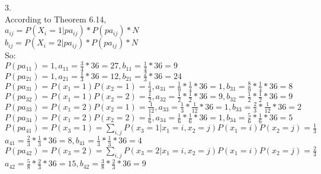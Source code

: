 \documentclass[a4paper]{article}
\begin{document}
3. \\
According to Theorem 6.14, \\
$a_{ij}=P(X_i=1|pa_{ij})*P(pa_{ij})*N$\\
$b_{ij}=P(X_i=2|pa_{ij})*P(pa_{ij})*N$\\
So:\\
$P(pa_{11}) = 1, a_{11}=\frac{3}{4}*36=27, b_{11}=\frac{1}{4}*36=9$\\
$P(pa_{21}) = 1, a_{21}=\frac{1}{3}*36=12, b_{21}=\frac{2}{3}*36=24$\\
$P(pa_{31}) = P(x_1=1)P(x_2=1)=\frac{1}{4}, a_{31}=\frac{1}{9}*\frac{1}{4}*36=1, b_{31}=\frac{8}{9}*\frac{1}{4}*36=8$\\
$P(pa_{32}) = P(x_1=1)P(x_2=2)=\frac{1}{2}, a_{32}=\frac{1}{2}*\frac{1}{2}*36=9, b_{32}=\frac{1}{2}*\frac{1}{2}*36=9$\\
$P(pa_{33}) = P(x_1=2)P(x_2=1)=\frac{1}{12}, a_{33}=\frac{1}{3}*\frac{1}{12}*36=1, b_{33}=\frac{2}{3}*\frac{1}{12}*36=2$\\
$P(pa_{34}) = P(x_1=2)P(x_2=2)=\frac{1}{6}, a_{34}=\frac{1}{6}*\frac{1}{6}*36=1, b_{34}=\frac{5}{6}*\frac{1}{6}*36=5$\\
$P(pa_{41}) = P(x_3=1) = \sum\limits_{i,j} P(x_3=1|x_1=i,x_2=j)P(x_1=i)P(x_2=j)=\frac{1}{3}$\\
$a_{41}=\frac{2}{3}*\frac{1}{3}*36=8, b_{41}=\frac{1}{3}*\frac{1}{3}*36=4$\\
$P(pa_{42}) = P(x_3=2) = \sum\limits_{i,j} P(x_3=2|x_1=i,x_2=j)P(x_1=i)P(x_2=j)=\frac{2}{3}$\\
$a_{42}=\frac{5}{8}*\frac{2}{3}*36=15, b_{42}=\frac{3}{8}*\frac{2}{3}*36=9$\\
\end{document}
